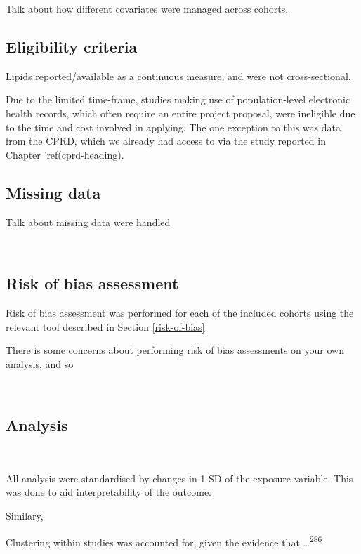 \documentclass[a4paper, twoside]{templates/ociamthesis}
\begin{document}
Talk about how different covariates were managed across cohorts,

\hypertarget{eligibility-criteria}{%
\subsection{Eligibility criteria}\label{eligibility-criteria}}

Lipids reported/available as a continuous measure, and were not cross-sectional.

Due to the limited time-frame, studies making use of population-level electronic health records, which often require an entire project proposal, were ineligible due to the time and cost involved in applying. The one exception to this was data from the CPRD, which we already had access to via the study reported in Chapter 'ref(cprd-heading).

\hypertarget{missing-data-2}{%
\subsection{Missing data}\label{missing-data-2}}

Talk about missing data were handled

~

\hypertarget{risk-of-bias-assessment}{%
\subsection{Risk of bias assessment}\label{risk-of-bias-assessment}}

Risk of bias assessment was performed for each of the included cohorts using the relevant tool described in Section \ref{risk-of-bias}.

There is some concerns about performing risk of bias assessments on your own analysis, and so

~

\hypertarget{analysis}{%
\subsection{Analysis}\label{analysis}}

~

All analysis were standardised by changes in 1-SD of the exposure variable. This was done to aid interpretability of the outcome.

Similary,

Clustering within studies was accounted for, given the evidence that \ldots{}\textsuperscript{\protect\hyperlink{ref-abo-zaid2013}{286}}
\end{document}
